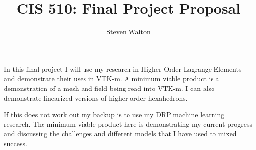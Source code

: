 \documentclass[12pt,letter]{article}
\begin{document}
\title{CIS 510: Final Project Proposal}
\author{Steven Walton}
\maketitle

In this final project I will use my research in Higher Order Lagrange Elements
and demonstrate their uses in VTK-m. A minimum viable product is a demonstration
of a mesh and field being read into VTK-m. I can also demonstrate linearized
versions of higher order hexahedrons.

If this does not work out my backup is to use my DRP machine learning research.
The minimum viable product here is demonstrating my current progress and
discussing the challenges and different models that I have used to mixed
success.
\end{document}
